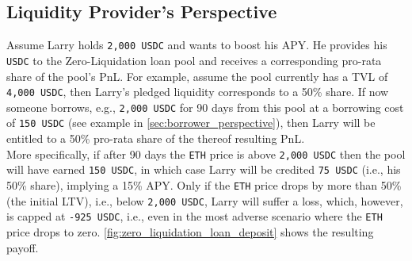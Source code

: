 \documentclass[a4paper]{article}
\begin{document}
\subsection{Liquidity Provider's Perspective}
Assume Larry holds \verb|2,000 USDC| and wants to boost his APY. He provides his \verb|USDC| to the Zero-Liquidation loan pool and receives a corresponding pro-rata share of the pool's PnL. For example, assume the pool currently has a TVL of \verb|4,000 USDC|, then Larry's pledged liquidity corresponds to a 50\% share. If now someone borrows, e.g., \verb|2,000 USDC| for 90 days from this pool at a borrowing cost of \verb|150 USDC| (see example in \cref{sec:borrower_perspective}), then Larry will be entitled to a 50\% pro-rata share of the thereof resulting PnL.\\

More specifically, if after 90 days the \verb|ETH| price is above \verb|2,000 USDC| then the pool will have earned \verb|150 USDC|, in which case Larry will be credited \verb|75 USDC| (i.e., his 50\% share), implying a 15\% APY. Only if the \verb|ETH| price drops by more than 50\% (the initial LTV), i.e., below \verb|2,000 USDC|, Larry will suffer a loss, which, however, is capped at \verb|-925 USDC|, i.e., even in the most adverse scenario where the \verb|ETH| price drops to zero. \cref{fig:zero_liquidation_loan_deposit} shows the resulting payoff.
\end{document}
